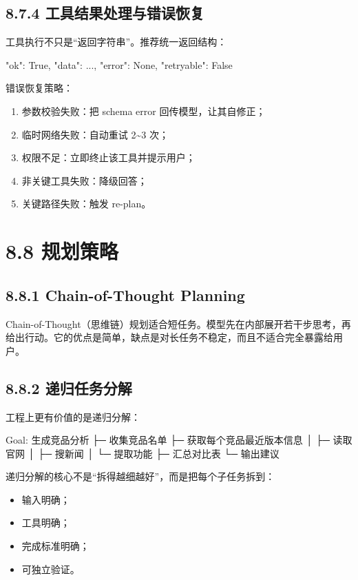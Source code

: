 \subsection{8.7.4 工具结果处理与错误恢复}

工具执行不只是``返回字符串''。推荐统一返回结构：


\begin{codeblock}
{
    "ok": True,
    "data": {...},
    "error": None,
    "retryable": False
}
\end{codeblock}

错误恢复策略：


\begin{enumerate}[leftmargin=2em]
\item 参数校验失败：把 schema error 回传模型，让其自修正；
\item 临时网络失败：自动重试 2\textasciitilde{}3 次；
\item 权限不足：立即终止该工具并提示用户；
\item 非关键工具失败：降级回答；
\item 关键路径失败：触发 re-plan。
\end{enumerate}

\section{8.8 规划策略}

\subsection{8.8.1 Chain-of-Thought Planning}

Chain-of-Thought（思维链）规划适合短任务。模型先在内部展开若干步思考，再给出行动。它的优点是简单，缺点是对长任务不稳定，而且不适合完全暴露给用户。


\subsection{8.8.2 递归任务分解}

工程上更有价值的是递归分解：


\begin{codeblock}
Goal: 生成竞品分析
 ├─ 收集竞品名单
 ├─ 获取每个竞品最近版本信息
 │   ├─ 读取官网
 │   ├─ 搜新闻
 │   └─ 提取功能
 ├─ 汇总对比表
 └─ 输出建议
\end{codeblock}

递归分解的核心不是``拆得越细越好''，而是把每个子任务拆到：


\begin{itemize}[leftmargin=2em]
\item 输入明确；
\item 工具明确；
\item 完成标准明确；
\item 可独立验证。
\end{itemize}


